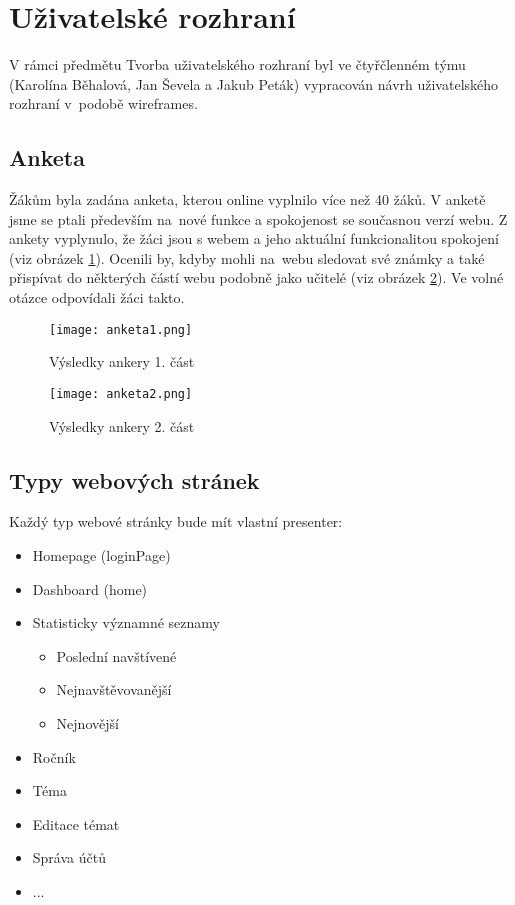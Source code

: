 \documentclass[thesis=B,czech]{FITthesis}[2012/06/26]
\begin{document}
\section{Uživatelské rozhraní}

V rámci předmětu Tvorba uživatelského rozhraní byl ve čtyřčlenném týmu (Karolína Běhalová, Jan Ševela a Jakub Peták) vypracován návrh uživatelského rozhraní v~podobě wireframes.

\subsection{Anketa}

Žákům byla zadána anketa, kterou online vyplnilo více než 40 žáků. V anketě jsme se ptali především na~nové funkce a spokojenost se současnou verzí webu. Z ankety vyplynulo, že žáci jsou s webem a jeho aktuální funkcionalitou spokojení (viz obrázek \ref{fig:anketa1}). Ocenili by, kdyby mohli na~webu sledovat své známky a také přispívat do některých částí webu podobně jako učitelé (viz obrázek \ref{fig:anketa2}). Ve volné otázce odpovídali žáci takto.

\begin{figure}
  \centering
	\texttt{[image: anketa1.png]}
	\caption{Výsledky ankery 1. část} \label{fig:anketa1} 
\end{figure}

\begin{figure}
  \centering
	\texttt{[image: anketa2.png]}
	\caption{Výsledky ankery 2. část} \label{fig:anketa2} 
\end{figure}






\subsection{Typy webových stránek}
Každý typ webové stránky bude mít vlastní presenter:

\begin{itemize}
	\item Homepage (loginPage)
	\item Dashboard (home)
	\item Statisticky významné seznamy
	\begin{itemize}
		\item Poslední navštívené
		\item Nejnavštěvovanější
		\item Nejnovější
	\end{itemize}
	\item 	Ročník
	\item Téma
	\item Editace témat
	\item Správa účtů
	\item ...
\end{itemize}
\end{document}
